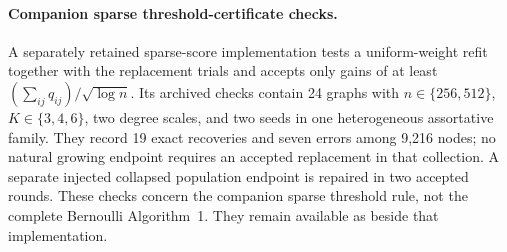 \paragraph{Companion sparse threshold-certificate checks.}
A separately retained sparse-score implementation tests a uniform-weight
refit together with the replacement trials and accepts only gains of at
least $(\sum_{ij}q_{ij})/\sqrt{\log n}$. Its archived checks contain 24
graphs with $n\in\{256,512\}$, $K\in\{3,4,6\}$, two degree scales,
and two seeds in one heterogeneous assortative family. They record 19 exact
recoveries and seven errors among 9,216 nodes; no natural growing endpoint
requires an accepted replacement in that collection. A separate injected
collapsed population endpoint is repaired in two accepted rounds. These
checks concern the companion sparse threshold rule, not the complete
Bernoulli Algorithm~1. They remain available as
 beside that implementation.
